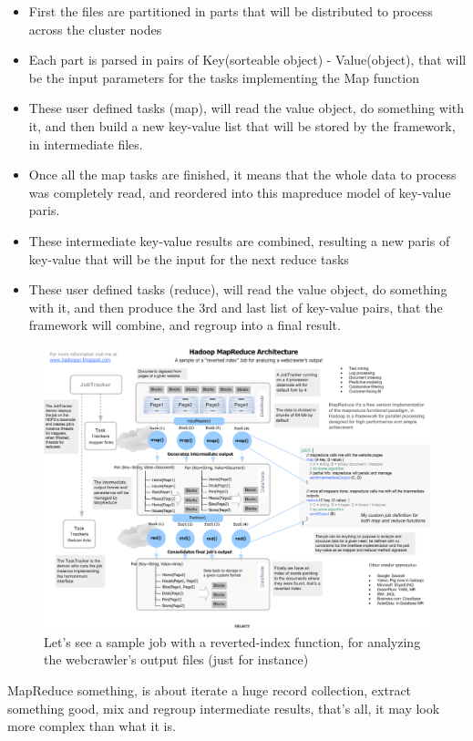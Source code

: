 \documentclass[12pt, right open]{memoir}
\begin{document}
\begin{itemize}
\item First the files are partitioned in parts that will be distributed to process across the cluster nodes
\item  Each part is parsed in pairs of Key(sorteable object) - Value(object), that will be the input parameters for the tasks implementing the Map function
\item  These user defined tasks (map), will read the value object, do something with it, and then build a new key-value list that will be stored by the framework, in intermediate files.
\item  Once all the map tasks are finished, it means that the whole data to process was completely read, and reordered into this mapreduce model of key-value paris.
\item  These intermediate key-value results are combined, resulting a new paris of key-value that will be the input for the next reduce tasks
\item  These user defined tasks (reduce), will read the value object, do something with it, and then produce the 3rd and last list of key-value pairs, that the framework will combine, and regroup into a final result.

\end{itemize}
\begin{figure}
\caption{Let's see a sample job with a reverted-index function, for analyzing the webcrawler's output files (just for instance)}
\label{tab:hadoop_map_reduce_architecture}
\centering
\includegraphics[scale=.33]{HadoopMRProcessSample.png}
\end{figure}

MapReduce something, is about iterate a huge record collection, extract something good, mix and regroup intermediate results, that's all, it may look more complex than what it is.
\end{document}
